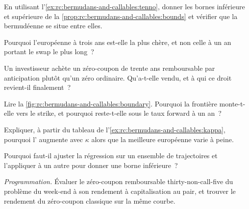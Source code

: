 \begin{exercise}[$\star$]\label{exo:rc:bermudans-and-callables:1}
En utilisant l'\cref{ex:rc:bermudans-and-callables:tenno}, donner les bornes inférieure et supérieure
de la \cref{prop:rc:bermudans-and-callables:bounds} et vérifier que la bermudéenne se situe
entre elles.
\end{exercise}

\begin{exercise}[$\star$]\label{exo:rc:bermudans-and-callables:2}
Pourquoi l'européenne à trois ans est-elle la plus chère, et non celle à un an
portant le swap le plus long~?
\end{exercise}

\begin{exercise}[$\star$]\label{exo:rc:bermudans-and-callables:3}
Un investisseur achète un zéro-coupon de trente ans remboursable par anticipation plutôt
qu'un zéro ordinaire. Qu'a-t-elle vendu, et à qui ce droit revient-il finalement~?
\end{exercise}

\begin{exercise}[$\star\star$]\label{exo:rc:bermudans-and-callables:4}
Lire la \cref{fig:rc:bermudans-and-callables:boundary}. Pourquoi la frontière monte-t-elle
vers le strike, et pourquoi reste-t-elle sous le taux forward à un an~?
\end{exercise}

\begin{exercise}[$\star\star$]\label{exo:rc:bermudans-and-callables:5}
Expliquer, à partir du tableau de l'\cref{ex:rc:bermudans-and-callables:kappa}, pourquoi
l' augmente avec $\kappa$ alors que la meilleure européenne varie à peine.
\end{exercise}

\begin{exercise}[$\star\star$]\label{exo:rc:bermudans-and-callables:6}
Pourquoi faut-il ajuster la régression sur un ensemble de trajectoires et l'appliquer à un autre pour
donner une borne inférieure~?
\end{exercise}

\begin{exercise}[$\star\star\star$]\label{exo:rc:bermudans-and-callables:7}
\emph{Programmation.} Évaluer le zéro-coupon remboursable thirty-non-call-five du problème du week-end
à son rendement à capitalisation au pair, et trouver le rendement du zéro-coupon classique sur la même
courbe.
\end{exercise}

